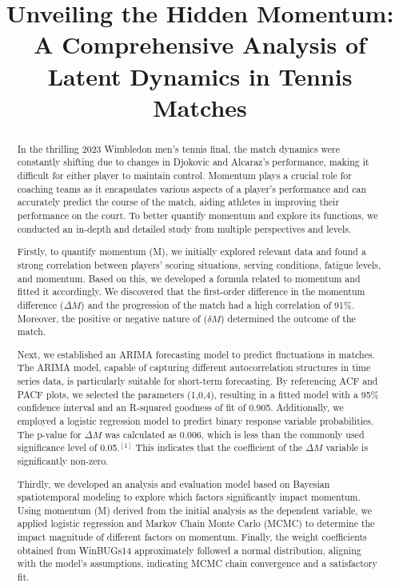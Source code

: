 \documentclass[12pt]{article}
\title{Unveiling the Hidden Momentum: A Comprehensive Analysis of Latent Dynamics in Tennis Matches}
\begin{document}
\begin{abstract}
    In the thrilling 2023 Wimbledon men's tennis final, the match dynamics were constantly shifting due to changes in Djokovic and Alcaraz's performance, making it difficult for either player to maintain control. Momentum plays a crucial role for coaching teams as it encapsulates various aspects of a player's performance and can accurately predict the course of the match, aiding athletes in improving their performance on the court. To better quantify momentum and explore its functions, we conducted an in-depth and detailed study from multiple perspectives and levels.

Firstly, to quantify momentum (M), we initially explored relevant data and found a strong correlation between players' scoring situations, serving conditions, fatigue levels, and momentum. Based on this, we developed a formula related to momentum and fitted it accordingly. We discovered that the first-order difference in the momentum difference ($\Delta M$) and the progression of the match had a high correlation of 91\%. Moreover, the positive or negative nature of ($\delta M$) determined the outcome of the match.

Next, we established an ARIMA forecasting model to predict fluctuations in matches. The ARIMA model, capable of capturing different autocorrelation structures in time series data, is particularly suitable for short-term forecasting. By referencing ACF and PACF plots, we selected the parameters (1,0,4), resulting in a fitted model with a 95\% confidence interval and an R-squared goodness of fit of 0.905. Additionally, we employed a logistic regression model to predict binary response variable probabilities. The p-value for $\Delta M$ was calculated as 0.006, which is less than the commonly used significance level of 0.05.$ ^{[1]}$ This indicates that the coefficient of the $\Delta M$ variable is significantly non-zero.

Thirdly, we developed an analysis and evaluation model based on Bayesian spatiotemporal modeling to explore which factors significantly impact momentum. Using momentum (M) derived from the initial analysis as the dependent variable, we applied logistic regression and Markov Chain Monte Carlo (MCMC) to determine the impact magnitude of different factors on momentum. Finally, the weight coefficients obtained from WinBUGs14 approximately followed a normal distribution, aligning with the model's assumptions, indicating MCMC chain convergence and a satisfactory fit.


\end{abstract}
\end{document}
